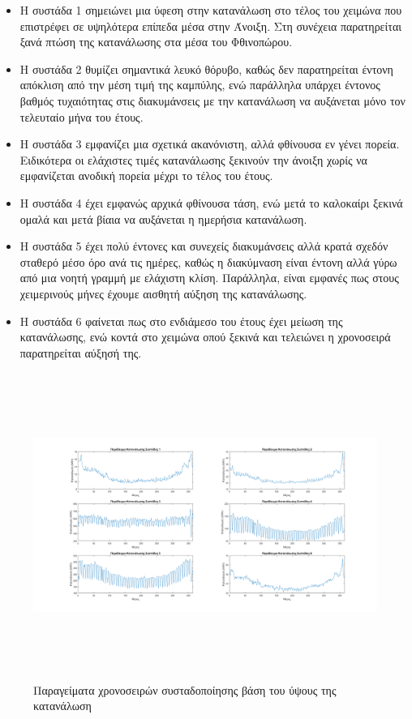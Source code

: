 \begin{itemize}
\item Η συστάδα 1 σημειώνει μια ύφεση στην κατανάλωση στο τέλος του χειμώνα που επιστρέφει σε υψηλότερα επίπεδα μέσα στην Άνοιξη. Στη συνέχεια παρατηρείται ξανά πτώση της κατανάλωσης στα μέσα του Φθινοπώρου.
\item Η συστάδα 2 θυμίζει σημαντικά λευκό θόρυβο, καθώς δεν παρατηρείται έντονη απόκλιση από την μέση τιμή της καμπύλης, ενώ παράλληλα υπάρχει έντονος βαθμός τυχαιότητας στις διακυμάνσεις με την κατανάλωση να αυξάνεται μόνο τον τελευταίο μήνα του έτους.
\item Η συστάδα 3 εμφανίζει μια σχετικά ακανόνιστη, αλλά φθίνουσα εν γένει πορεία. Ειδικότερα οι ελάχιστες τιμές κατανάλωσης ξεκινούν την άνοιξη χωρίς να εμφανίζεται ανοδική πορεία μέχρι το τέλος του έτους.
\item Η συστάδα 4 έχει εμφανώς αρχικά φθίνουσα τάση, ενώ μετά το καλοκαίρι ξεκινά ομαλά και μετά βίαια να αυξάνεται η ημερήσια κατανάλωση.
\item Η συστάδα 5 έχει πολύ έντονες και συνεχείς διακυμάνσεις αλλά κρατά σχεδόν σταθερό μέσο όρο ανά τις ημέρες, καθώς η διακύμναση είναι έντονη αλλά γύρω από μια νοητή γραμμή με ελάχιστη κλίση. Παράλληλα, είναι εμφανές πως στους χειμερινούς μήνες έχουμε αισθητή αύξηση της κατανάλωσης.
\item Η συστάδα 6 φαίνεται πως στο ενδιάμεσο του έτους έχει μείωση της κατανάλωσης, ενώ κοντά στο χειμώνα οπού ξεκινά και τελειώνει η χρονοσειρά παρατηρείται αύξησή της. 
\end{itemize}
\begin{figure}[ht!]
\centering
\includegraphics[width=180mm, height=100mm]{../../plots/Consumption_Analysis/gr_cluster_cons_level.png}
\caption{Παραγείματα χρονοσειρών συσταδοποίησης βάση του ύψους της κατανάλωση}
\label{fig:clusterform}
\end{figure}
